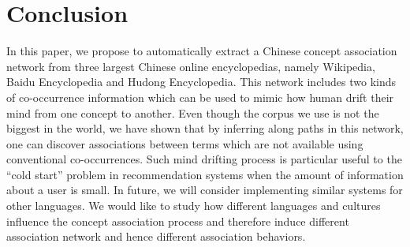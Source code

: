\section{Conclusion}
\label{sec:conclude}
In this paper, we propose to automatically extract a Chinese 
concept association network from three largest Chinese online
encyclopedias, namely Wikipedia, Baidu Encyclopedia and Hudong 
Encyclopedia. 
This network includes two kinds of co-occurrence
information which can be used to mimic how human drift their mind
from one concept to another. Even though the corpus we use is not
the biggest in the world, we have shown that by inferring along paths
in this network, one can discover associations between terms which are
not available using conventional co-occurrences. Such mind drifting process
is particular useful to the ``cold start'' problem in recommendation
systems when the amount of information about a user is small. 
In future, we will consider implementing similar systems for other languages.
We would like to study how different languages and cultures influence
the concept association process and therefore induce different association
network and hence different association behaviors.

